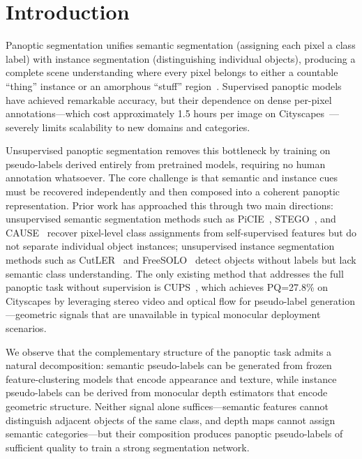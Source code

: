 \documentclass{bmvc2k}
\begin{document}
\section{Introduction}
\label{sec:intro}

Panoptic segmentation unifies semantic segmentation (assigning each pixel a class label) with instance segmentation (distinguishing individual objects), producing a complete scene understanding where every pixel belongs to either a countable ``thing'' instance or an amorphous ``stuff'' region~\cite{kirillov2019panoptic}. Supervised panoptic models have achieved remarkable accuracy, but their dependence on dense per-pixel annotations---which cost approximately 1.5 hours per image on Cityscapes~\cite{cordts2016cityscapes}---severely limits scalability to new domains and categories.

Unsupervised panoptic segmentation removes this bottleneck by training on pseudo-labels derived entirely from pretrained models, requiring no human annotation whatsoever. The core challenge is that semantic and instance cues must be recovered independently and then composed into a coherent panoptic representation. Prior work has approached this through two main directions: unsupervised semantic segmentation methods such as PiCIE~\cite{cho2021picie}, STEGO~\cite{hamilton2022stego}, and CAUSE~\cite{kim2025cause} recover pixel-level class assignments from self-supervised features but do not separate individual object instances; unsupervised instance segmentation methods such as CutLER~\cite{wang2023cutler} and FreeSOLO~\cite{wang2022freesolo} detect objects without labels but lack semantic class understanding. The only existing method that addresses the full panoptic task without supervision is CUPS~\cite{hahn2025cups}, which achieves PQ=27.8\% on Cityscapes by leveraging stereo video and optical flow for pseudo-label generation---geometric signals that are unavailable in typical monocular deployment scenarios.

We observe that the complementary structure of the panoptic task admits a natural decomposition: semantic pseudo-labels can be generated from frozen feature-clustering models that encode appearance and texture, while instance pseudo-labels can be derived from monocular depth estimators that encode geometric structure. Neither signal alone suffices---semantic features cannot distinguish adjacent objects of the same class, and depth maps cannot assign semantic categories---but their composition produces panoptic pseudo-labels of sufficient quality to train a strong segmentation network.
\end{document}
